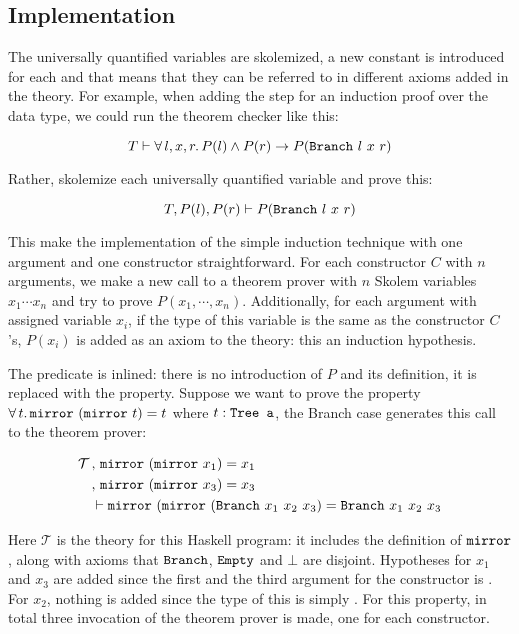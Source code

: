 \subsection{Implementation}

The universally quantified variables are skolemized, a new constant is
introduced for each and that means that they can be referred to in
different axioms added in the theory. For example, when adding the
 step for an induction proof over the  data type,
we could run the theorem checker like this:

\begin{equation*}
T \vdash \faaa{l}{x}{r} P(l) \wedge P(r) \rightarrow P(\hs{Branch} \w l \w x \w r)
\end{equation*}

Rather, skolemize each universally quantified variable and prove this:

\begin{equation*}
T , P(l) , P(r) \vdash P(\hs{Branch} \w l \w x \w r)
\end{equation*}

This make the implementation of the simple induction technique with
one argument and one constructor straightforward. For each constructor
$C$ with $n$ arguments, we make a new call to a theorem prover with $n$
Skolem variables $x_1 \cdots x_n$ and try to prove $P(x_1,\cdots,x_n)$.
Additionally, for each argument with assigned variable $x_i$, if the
type of this variable is the same as the constructor $C$'s, $P(x_i)$
is added as an axiom to the theory: this an induction hypothesis.

The predicate is inlined: there is no introduction of $P$ and its
definition, it is replaced with the property. Suppose we want to prove
the property
$\fa{t} \hs{mirror} \w (\hs{mirror} \w t) = t$ where $t : \hs{Tree a}$,
the Branch case generates this call to the theorem prover:

\begin{align*}
\mathcal{T} \, & , \, \hs{mirror} \w (\hs{mirror} \w x_1) \eq x_1 \\
            \, & , \, \hs{mirror} \w (\hs{mirror} \w x_3) \eq x_3 \\
               &\vdash \hs{mirror} \w (\hs{mirror} \w (\hs{Branch} \w x_1 \w x_2\w x_3) \eq \hs{Branch} \w x_1 \w x_2\w x_3
\end{align*}

Here $\mathcal{T}$ is the theory for this Haskell program: it includes the
definition of $\hs{mirror}$, along with axioms that $\hs{Branch}$,
$\hs{Empty}$ and $\bot$ are disjoint.  Hypotheses for $x_1$ and $x_3$
are added since the first and the third argument for the 
constructor is . For $x_2$, nothing is added since the type
of this is simply .  For this property, in total three
invocation of the theorem prover is made, one for each constructor.


